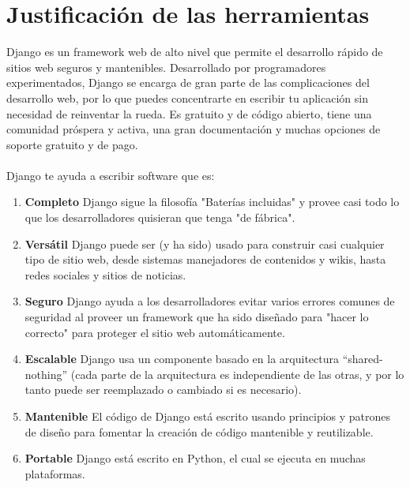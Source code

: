 \documentclass[letterpaper,12pt]{article}
\begin{document}
\section{Justificación de las herramientas}
Django es un framework web de alto nivel que permite el desarrollo rápido de sitios web seguros y mantenibles. Desarrollado por programadores experimentados, Django se encarga de gran parte de las complicaciones del desarrollo web, por lo que puedes concentrarte en escribir tu aplicación sin necesidad de reinventar la rueda. Es gratuito y de código abierto, tiene una comunidad próspera y activa, una gran documentación y muchas opciones de soporte gratuito y de pago.\\\\
Django te ayuda a escribir software que es:
\begin{enumerate}
	\item \textbf{Completo}
	Django sigue la filosofía "Baterías incluidas" y provee casi todo lo que los desarrolladores quisieran que tenga "de fábrica".
	\item \textbf{Versátil}
	Django puede ser (y ha sido) usado para construir casi cualquier tipo de sitio web, desde sistemas manejadores de contenidos y wikis, hasta redes sociales y sitios de noticias. 
	
	\item \textbf{Seguro}
	Django ayuda a los desarrolladores evitar varios errores comunes de seguridad al proveer un framework que ha sido diseñado para "hacer lo correcto" para proteger el sitio web automáticamente. 
	
	\item \textbf{Escalable}
	Django usa un componente basado en la arquitectura “shared-nothing” (cada parte de la arquitectura es independiente de las otras, y por lo tanto puede ser reemplazado o cambiado si es necesario). 
	
	\item \textbf{Mantenible}
	El código de Django está escrito usando principios y patrones de diseño para fomentar la creación de código mantenible y reutilizable. 
	
	\item \textbf{Portable} 
	Django está escrito en Python, el cual se ejecuta en muchas plataformas.
\end{enumerate}
\end{document}
